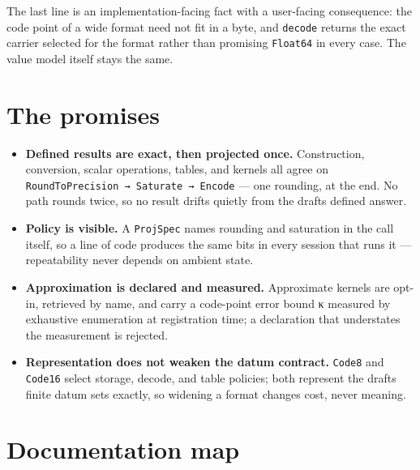 The last line is an implementation-facing fact with a user-facing consequence: the code point of a wide format need not fit in a byte, and \texttt{decode} returns the exact carrier selected for the format rather than promising \texttt{Float64} in every case. The value model itself stays the same.



\section{The promises}



\label{4266919482244425209}{}


\begin{itemize}
\item \textbf{Defined results are exact, then projected once.} Construction, conversion, scalar operations, tables, and kernels all agree on \texttt{RoundToPrecision → Saturate → Encode} — one rounding, at the end. No path rounds twice, so no result drifts quietly from the draft{\textquotesingle}s defined answer.


\item \textbf{Policy is visible.} A \texttt{ProjSpec} names rounding and saturation in the call itself, so a line of code produces the same bits in every session that runs it — repeatability never depends on ambient state.


\item \textbf{Approximation is declared and measured.} Approximate kernels are opt-in, retrieved by name, and carry a code-point error bound κ measured by exhaustive enumeration at registration time; a declaration that understates the measurement is rejected.


\item \textbf{Representation does not weaken the datum contract.} \texttt{Code8} and \texttt{Code16} select storage, decode, and table policies; both represent the draft{\textquotesingle}s finite datum sets exactly, so widening a format changes cost, never meaning.

\end{itemize}


\section{Documentation map}



\label{558805016199603468}{}


